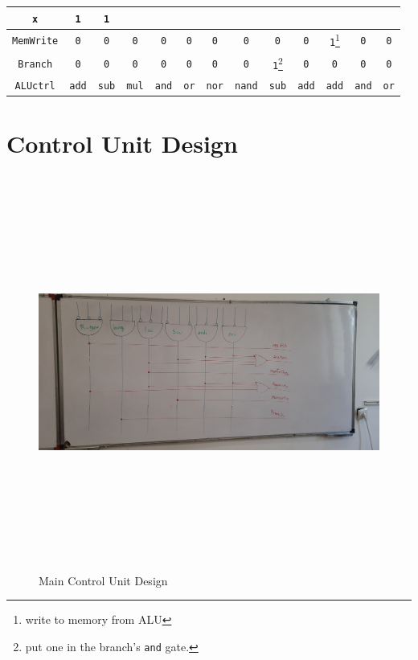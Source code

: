\documentclass[12pt, dvipsnames, svgnames, x11names, oneside]{book}
\begin{document}
\begin{table}
\begin{center}
\begin{tabular}{|c|c|c|c|c|c|c|c|c|c|c|c|c|}
					\texttt{x} &
					\texttt{1} &
					\texttt{1} \\ 
					\hline
					\texttt{MemWrite} &
					\texttt{0} &
					\texttt{0} &
					\texttt{0} &
					\texttt{0} &
					\texttt{0} &
					\texttt{0} &
					\texttt{0} &
					\texttt{0} &
					\texttt{0} &
					\texttt{1}\footnote{write to memory from ALU} &
					\texttt{0} &
					\texttt{0} \\ 
					\hline
					\texttt{Branch} &
					\texttt{0} &
					\texttt{0} &
					\texttt{0} &
					\texttt{0} &
					\texttt{0} &
					\texttt{0} &
					\texttt{0} &
					\texttt{1}\footnote{put one in the branch's \texttt{and} gate.} &
					\texttt{0} &
					\texttt{0} &
					\texttt{0} &
					\texttt{0} \\ 
					\hline
					\texttt{ALUctrl} &
					\texttt{add} &
					\texttt{sub} &
					\texttt{mul} &
					\texttt{and} &
					\texttt{or} &
					\texttt{nor} &
					\texttt{nand} &
					\texttt{sub} &
					\texttt{add} &
					\texttt{add} &
					\texttt{and} &
					\texttt{or} \\ 
					\hline
				\end{tabular}
			\end{center}
		\end{table}\label{sec:table:cu}
	
		\section{Control Unit Design}
			\begin{figure}[H]
				\begin{center}
					\includegraphics[width=16cm, height=13cm, angle=90]{./images/cu}
				\end{center}
			\caption{Main Control Unit Design}
			\end{figure}
			
\end{document}
